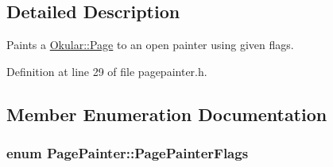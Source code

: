 \subsection{Detailed Description}
Paints a \hyperlink{classOkular_1_1Page}{Okular\+::\+Page} to an open painter using given flags. 

Definition at line 29 of file pagepainter.\+h.



\subsection{Member Enumeration Documentation}
\hypertarget{classPagePainter_ae7f51ac72a598d2753cfc35ecdb51e01}{
\subsubsection[{Page\+Painter\+Flags}]{\setlength{\rightskip}{0pt plus 5cm}enum {\bf Page\+Painter\+::\+Page\+Painter\+Flags}}}\label{classPagePainter_ae7f51ac72a598d2753cfc35ecdb51e01}
